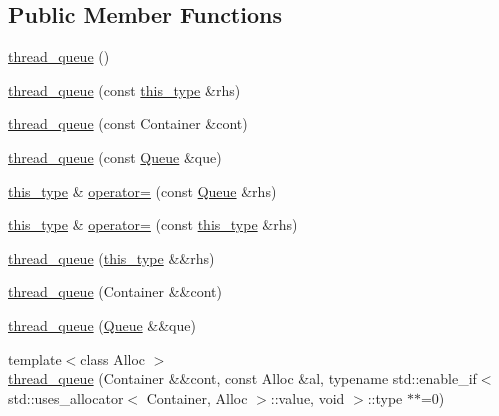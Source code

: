 \subsection*{\-Public \-Member \-Functions}
\begin{DoxyCompactItemize}
\item 
\hyperlink{classyuh_1_1thread__queue_a351f4b74ea3eeed9ca3c3ce324bb4a34}{thread\-\_\-queue} ()
\item 
\hyperlink{classyuh_1_1thread__queue_ae5e81148c88c2f92f26f2fdcba53ab4f}{thread\-\_\-queue} (const \hyperlink{classyuh_1_1thread__queue_a0b6cc122d5afe5dba8a2622add14ec45}{this\-\_\-type} \&rhs)
\item 
\hyperlink{classyuh_1_1thread__queue_a30b22be83754798f68406e65549bd395}{thread\-\_\-queue} (const \-Container \&cont)
\item 
\hyperlink{classyuh_1_1thread__queue_aac3815e091e8b16591e50b95a6e37465}{thread\-\_\-queue} (const \hyperlink{classyuh_1_1thread__queue_a7298798dd8d5df210bee3a306107bd43}{\-Queue} \&que)
\item 
\hyperlink{classyuh_1_1thread__queue_a0b6cc122d5afe5dba8a2622add14ec45}{this\-\_\-type} \& \hyperlink{classyuh_1_1thread__queue_a082c6a98eff4a65fb915cf7692dbec1c}{operator=} (const \hyperlink{classyuh_1_1thread__queue_a7298798dd8d5df210bee3a306107bd43}{\-Queue} \&rhs)
\item 
\hyperlink{classyuh_1_1thread__queue_a0b6cc122d5afe5dba8a2622add14ec45}{this\-\_\-type} \& \hyperlink{classyuh_1_1thread__queue_a94c67d88412045c793e496e90458bfe3}{operator=} (const \hyperlink{classyuh_1_1thread__queue_a0b6cc122d5afe5dba8a2622add14ec45}{this\-\_\-type} \&rhs)
\item 
\hyperlink{classyuh_1_1thread__queue_a9af3c5bbf864342fe018092124a27a94}{thread\-\_\-queue} (\hyperlink{classyuh_1_1thread__queue_a0b6cc122d5afe5dba8a2622add14ec45}{this\-\_\-type} \&\&rhs)
\item 
\hyperlink{classyuh_1_1thread__queue_ae5bbd4613c1cb48d2f888cccbbb61b91}{thread\-\_\-queue} (\-Container \&\&cont)
\item 
\hyperlink{classyuh_1_1thread__queue_acb4e7069c35004c605abba5156243268}{thread\-\_\-queue} (\hyperlink{classyuh_1_1thread__queue_a7298798dd8d5df210bee3a306107bd43}{\-Queue} \&\&que)
\item 
{\footnotesize template$<$class Alloc $>$ }\\\hyperlink{classyuh_1_1thread__queue_a4710558fa7e478dc387bde5632684950}{thread\-\_\-queue} (\-Container \&\&cont, const \-Alloc \&al, typename std\-::enable\-\_\-if$<$ std\-::uses\-\_\-allocator$<$ \-Container, \-Alloc $>$\-::value, void $>$\-::type $\ast$$\ast$=0)
$$
\end{DoxyCompactItemize}
